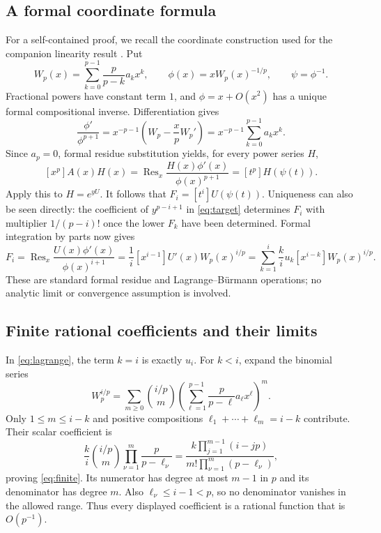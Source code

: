 \documentclass[11pt]{article}
\newcommand{\Res}{\operatorname{Res}}
\begin{document}
\subsection*{A formal coordinate formula}
For a self-contained proof, we recall the coordinate construction
used for the companion linearity result \cite{companion}. Put
\[
 W_p(x)=\sum_{k=0}^{p-1}\frac{p}{p-k}a_kx^k,\qquad
 \phi(x)=xW_p(x)^{-1/p},\qquad \psi=\phi^{-1}.
\]
Fractional powers have constant term $1$, and $\phi=x+O(x^2)$
has a unique formal compositional inverse. Differentiation gives
\[
 \frac{\phi'}{\phi^{p+1}}
   =x^{-p-1}\left(W_p-\frac{x}{p}W_p'\right)
   =x^{-p-1}\sum_{k=0}^{p-1}a_kx^k.
\]
Since $a_p=0$, formal residue substitution yields, for every
power series $H$,
\[
 [x^p]A(x)H(x)
   =\Res_x\frac{H(x)\phi'(x)}{\phi(x)^{p+1}}
   =[t^p]H(\psi(t)).
\]
Apply this to $H=e^{yU}$. It follows that $F_i=[t^i]U(\psi(t))$.
Uniqueness can also be seen directly: the coefficient of
$y^{p-i+1}$ in \eqref{eq:target} determines $F_i$ with multiplier
$1/(p-i)!$ once the lower $F_k$ have been determined.
Formal integration by parts now gives
\begin{equation}\label{eq:lagrange}
 F_i=\Res_x\frac{U(x)\phi'(x)}{\phi(x)^{i+1}}
   =\frac1i[x^{i-1}]U'(x)W_p(x)^{i/p}
   =\sum_{k=1}^i\frac{k}{i}u_k[x^{i-k}]W_p(x)^{i/p}.
\end{equation}
These are standard formal residue and Lagrange--B\"urmann operations;
no analytic limit or convergence assumption is involved.

\subsection*{Finite rational coefficients and their limits}
In \eqref{eq:lagrange}, the term $k=i$ is exactly $u_i$.
For $k<i$, expand the binomial series
\[
 W_p^{i/p}=\sum_{m\ge0}\binom{i/p}{m}
       \left(\sum_{\ell=1}^{p-1}\frac{p}{p-\ell}a_\ell x^\ell\right)^m.
\]
Only $1\le m\le i-k$ and positive compositions
$\ell_1+\cdots+\ell_m=i-k$ contribute. Their scalar coefficient is
\[
 \frac{k}{i}\binom{i/p}{m}
        \prod_{\nu=1}^m\frac{p}{p-\ell_\nu}
 =\frac{k\prod_{j=1}^{m-1}(i-jp)}
        {m!\prod_{\nu=1}^m(p-\ell_\nu)},
\]
proving \eqref{eq:finite}. Its numerator has degree at most $m-1$
in $p$ and its denominator has degree $m$. Also
$\ell_\nu\le i-1<p$, so no denominator vanishes in the allowed range.
Thus every displayed coefficient is a rational function that is
$O(p^{-1})$.
\end{document}
